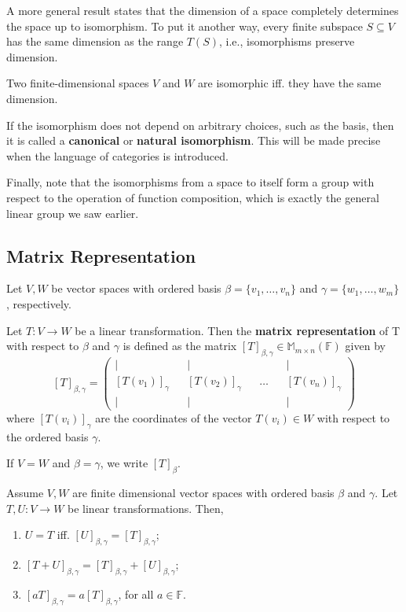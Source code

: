 A more general result states that the dimension of a space completely determines the space up to isomorphism. To put it another way, every finite subspace $S \subseteq V$ has the same dimension as the range $T(S)$, i.e., isomorphisms preserve dimension.

\begin{theorem}
	Two finite-dimensional spaces $V$ and $W$ are isomorphic iff. they have the same dimension.
\end{theorem}

If the isomorphism does not depend on arbitrary choices, such as the basis, then it is called a \textbf{canonical} or \textbf{natural isomorphism}. This will be made precise when the language of categories is introduced.

Finally, note that the isomorphisms from a space to itself form a group with respect to the operation of function composition, which is exactly the general linear group we saw earlier.

\subsection{Matrix Representation}

\begin{definition}
	Let $V, W$ be vector spaces with ordered basis $\beta = \{ v_1, \ldots, v_n \}$ and $\gamma = \{ w_1, \ldots, w_m \}$, respectively.

	Let $T : V \longrightarrow W$ be a linear transformation. Then the \textbf{matrix representation} of T with respect to $\beta$ and $\gamma$ is defined as the matrix $[T]_{\beta, \gamma} \in \mathbb{M}_{m \times n}(\mathbb{F})$ given by 
	\[
		[T]_{\beta, \gamma} = \left(\begin{matrix}
			\big| && \big| && && \big| \\
			[T(v_1)]_\gamma &&  [T(v_2)]_\gamma && \ldots && [T(v_n)]_\gamma \\
			\big| && \big| && && \big|
			\end{matrix}\right)
	\]
	where $[T(v_i)]_\gamma$ are the coordinates of the vector $T(v_i) \in W$ with respect to the ordered basis $\gamma$.

	If $V = W$ and $\beta = \gamma$, we write $[T]_\beta$.
\end{definition}

\begin{theorem}
	Assume $V, W$ are finite dimensional vector spaces with ordered basis $\beta$ and $\gamma$. Let $T, U : V \longrightarrow W$ be linear transformations. Then,
	\begin{enumerate}
		\item $U = T$ iff. $[U]_{\beta,\gamma} = [T]_{\beta,\gamma}$;
		\item $[T+U]_{\beta,\gamma} = [T]_{\beta,\gamma} + [U]_{\beta,\gamma}$;
		\item $[aT]_{\beta,\gamma} = a[T]_{\beta,\gamma}$, for all $a \in \mathbb{F}$.
	\end{enumerate}
\end{theorem}


